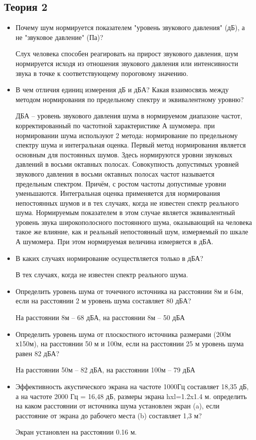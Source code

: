 \documentclass[12pt]{article}
\begin{document}
\subsection*{Теория 2}
\begin{itemize}

\item Почему шум нормируется показателем "уровень звукового давления" (дБ), а не "звуковое давление" (Па)?

Слух человека способен реагировать на прирост звукового давления, шум нормируется исходя из отношения звукового давления или интенсивности звука в точке к соответствующему пороговому значению.

\item В чем отличия единиц измерения дБ и дБА? Какая взаимосвязь между методом нормирования по предельному спектру и эквивалентному уровню?

ДБА – уровень звукового давления шума в нормируемом диапазоне частот, корректированный по частотной характеристике А шумомера. 
при нормировании шума используют 2 метода: нормирование по предельному спектру шума и интегральная оценка.
Первый метод нормирования является основным для постоянных шумов. Здесь нормируются уровни звуковых давлений в восьми октавных полосах. Совокупность допустимых уровней звукового давления в восьми октавных полосах частот называется предельным спектром. Причём, с ростом частоты допустимые уровни уменьшаются.
Интегральная оценка применяется для нормирования непостоянных шумов и в тех случаях, когда не известен спектр реального шума. Нормируемым показателем в этом случае является эквивалентный уровень звука широкополосного постоянного шума, оказывающий на человека такое же влияние, как и реальный непостоянный шум, измеряемый по шкале А шумомера. При этом нормируемая величина измеряется в дБА.

\item В каких случаях нормирование осуществляется только в дБА?

В тех случаях, когда не известен спектр реального шума.

\item Определить уровень шума от точечного источника на расстоянии 8м и 64м, если на расстоянии 2 м уровень шума составляет 80 дБА?

На расстоянии 8м -- 68 дБА, на расстоянии 8м -- 50 дБА

\item Определить уровень шума от плоскостного источника размерами (200м х150м), на расстоянии 50 м и 100м,  если на расстоянии 25 м уровень шума равен 82 дБА?

На расстоянии 50м -- 82 дБА, на расстоянии 100м -- 79 дБА

\item Эффективность акустического экрана на частоте 1000Гц составляет 18,35 дБ, а на частоте 2000 Гц = 16,48 дБ, размеры экрана hxl=1.2x1.4 м. определить на каком расстоянии от источника шума установлен экран (a), если расстояние от экрана до рабочего места (b) составляет 1,3 м?

Экран установлен на расстоянии 0.16 м.

\end{itemize}
\end{document}

